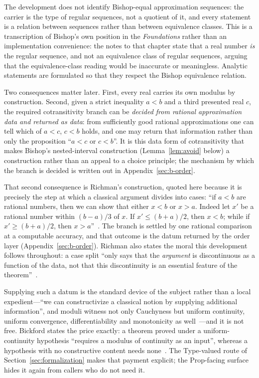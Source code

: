 \documentclass[11pt]{article}
\theoremstyle{definition}
\theoremstyle{remark}
\begin{document}
The development does not identify Bishop-equal approximation sequences: the carrier is the type of regular sequences, not a quotient of it, and every statement is a relation between sequences rather than between equivalence classes.  This is a transcription of Bishop's own position in the \emph{Foundations} rather than an implementation convenience: the notes to that chapter state that a real number \emph{is} the regular sequence, and not an equivalence class of regular sequences, arguing that the equivalence-class reading would be inaccurate or meaningless.  Analytic statements are formulated so that they respect the Bishop equivalence relation.

Two consequences matter later.  First, every real carries its own modulus by construction.  Second, given a strict inequality $a<b$ and a third presented real $c$, the required cotransitivity branch can be \emph{decided from rational approximation data and returned as data}: from sufficiently good rational approximations one can tell which of $a<c$, $c<b$ holds, and one may return that information rather than only the proposition ``$a<c$ or $c<b$''.  It is this data form of cotransitivity that makes Bishop's nested-interval construction (Lemma~\ref{lem:avoid} below) a construction rather than an appeal to a choice principle; the mechanism by which the branch is decided is written out in Appendix~\ref{sec:b-order}.

That second consequence is Richman's construction, quoted here because it is precisely the step at which a classical argument divides into cases: ``if $a<b$ are rational numbers, then we can show that either $x<b$ or $x>a$.  Indeed let $x'$ be a rational number within $(b-a)/3$ of $x$.  If $x'\le(b+a)/2$, then $x<b$; while if $x'\ge(b+a)/2$, then $x>a$''~\cite{richman-1982}.  The branch is settled by one rational comparison at a computable accuracy, and that outcome is the datum returned by the order layer (Appendix~\ref{sec:b-order}).  Richman also states the moral this development follows throughout: a case split ``only says that the \emph{argument} is discontinuous as a function of the data, not that this discontinuity is an essential feature of the theorem''~\cite{richman-1982}.

Supplying such a datum is the standard device of the subject rather than a local expedient---``we can constructivize a classical notion by supplying additional information'', and moduli witness not only Cauchyness but uniform continuity, uniform convergence, differentiability and monotonicity as well~\cite[\S27.2.1]{miyamoto-2023}---and it is not free.  Bickford states the price exactly: a theorem proved under a uniform-continuity hypothesis ``requires a modulus of continuity as an input'', whereas a hypothesis with no constructive content needs none~\cite[\S28.1]{bickford-2023}.  The Type-valued route of Section~\ref{sec:formalization} makes that payment explicit; the Prop-facing surface hides it again from callers who do not need it.
\end{document}
